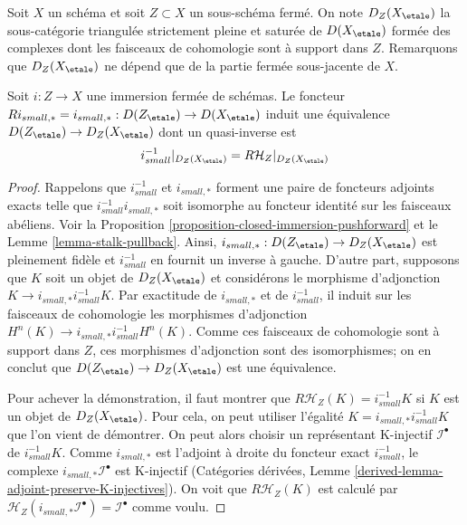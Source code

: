 \noindent
Soit $X$ un schéma et soit $Z \subset X$ un sous-schéma fermé.
On note $D_Z(X_\etale)$ la sous-catégorie triangulée strictement pleine et
saturée de $D(X_\etale)$ formée des complexes dont les faisceaux de cohomologie
sont à support dans $Z$. Remarquons que $D_Z(X_\etale)$ ne dépend que
de la partie fermée sous-jacente de $X$.

\begin{lemma}
\label{lemma-complexes-with-support-on-closed}
Soit $i : Z \to X$ une immersion fermée de schémas.
Le foncteur $Ri_{small, *} = i_{small, *} : D(Z_\etale) \to D(X_\etale)$
induit une équivalence $D(Z_\etale) \to D_Z(X_\etale)$ dont un quasi-inverse est
$$
i_{small}^{-1}|_{D_Z(X_\etale)} = R\mathcal{H}_Z|_{D_Z(X_\etale)}
$$
\end{lemma}

\begin{proof}
Rappelons que $i_{small}^{-1}$ et $i_{small, *}$ forment une paire de foncteurs
adjoints exacts telle que $i_{small}^{-1}i_{small, *}$ soit isomorphe au
foncteur identité sur les faisceaux abéliens. Voir la
Proposition \ref{proposition-closed-immersion-pushforward} et le
Lemme \ref{lemma-stalk-pullback}. Ainsi,
$i_{small, *} : D(Z_\etale) \to D_Z(X_\etale)$ est pleinement fidèle et
$i_{small}^{-1}$ en fournit
un inverse à gauche. D'autre part, supposons que $K$ soit un objet de
$D_Z(X_\etale)$ et considérons le morphisme d'adjonction
$K \to i_{small, *}i_{small}^{-1}K$.
Par exactitude de $i_{small, *}$ et de $i_{small}^{-1}$,
il induit sur les faisceaux de cohomologie les morphismes d'adjonction
$H^n(K) \to i_{small, *}i_{small}^{-1}H^n(K)$.
Comme ces faisceaux de cohomologie
sont à support dans $Z$, ces morphismes d'adjonction sont des isomorphismes;
on en conclut que $D(Z_\etale) \to D_Z(X_\etale)$ est une équivalence.

\medskip\noindent
Pour achever la démonstration, il faut montrer que $R\mathcal{H}_Z(K) = i_{small}^{-1}K$
si $K$ est un objet de $D_Z(X_\etale)$. Pour cela, on peut utiliser l'égalité
$K = i_{small, *}i_{small}^{-1}K$
que l'on vient de démontrer. On peut alors
choisir un représentant K-injectif $\mathcal{I}^\bullet$ de
$i_{small}^{-1}K$.
Comme $i_{small, *}$ est l'adjoint à droite du foncteur exact
$i_{small}^{-1}$, le
complexe $i_{small, *}\mathcal{I}^\bullet$ est K-injectif
(Catégories dérivées, Lemme \ref{derived-lemma-adjoint-preserve-K-injectives}).
On voit que $R\mathcal{H}_Z(K)$ est calculé par
$\mathcal{H}_Z(i_{small, *}\mathcal{I}^\bullet) = \mathcal{I}^\bullet$
comme voulu.
\end{proof}


